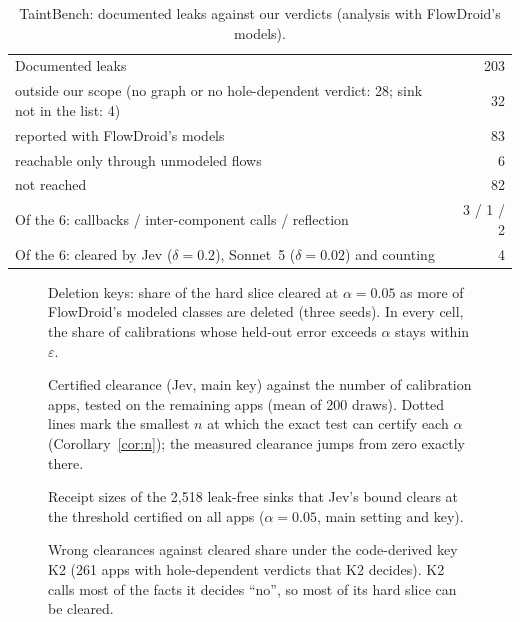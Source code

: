 \begin{table}[h]
\caption{TaintBench: documented leaks against our verdicts (analysis with FlowDroid's models).}
\label{tab:taintbench}
\small
\begin{tabular}{@{}lr@{}}
\toprule
Documented leaks & 203\\
\quad outside our scope (no graph or no hole-dependent verdict: 28; sink not in the list: 4) & 32\\
\quad reported with FlowDroid's models & 83\\
\quad reachable only through unmodeled flows & 6\\
\quad not reached & 82\\
\midrule
Of the 6: callbacks / inter-component calls / reflection & 3 / 1 / 2\\
Of the 6: cleared by Jev ($\delta=0.2$), Sonnet~5 ($\delta=0.02$) and counting & 4\\
\bottomrule
\end{tabular}
\end{table}

\begin{figure}[h]

\caption{Deletion keys: share of the hard slice cleared at $\alpha=0.05$ as more of FlowDroid's modeled classes are deleted (three seeds). In every cell, the share of calibrations whose held-out error exceeds $\alpha$ stays within $\varepsilon$.}
\label{fig:deletion}
\end{figure}

\begin{figure}[h]

\caption{Certified clearance (Jev, main key) against the number of calibration apps, tested on the remaining apps (mean of 200 draws). Dotted lines mark the smallest $n$ at which the exact test can certify each $\alpha$ (Corollary~\ref{cor:n}); the measured clearance jumps from zero exactly there.}
\label{fig:learning}
\end{figure}

\begin{figure}[h]

\caption{Receipt sizes of the 2{,}518 leak-free sinks that Jev's bound clears at the threshold certified on all apps ($\alpha=0.05$, main setting and key).}
\label{fig:sizes}
\end{figure}

\begin{figure}[h]

\caption{Wrong clearances against cleared share under the code-derived key K2 (261 apps with hole-dependent verdicts that K2 decides). K2 calls most of the facts it decides ``no'', so most of its hard slice can be cleared.}
\label{fig:curve-k2}
\end{figure}
